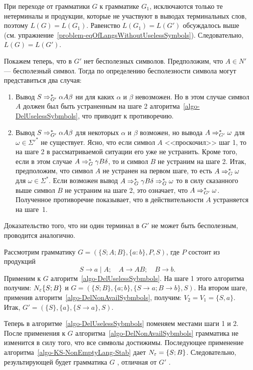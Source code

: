 \begin{myproof}
При переходе от грамматики $G$ к грамматике $G_1$, исключаются только те нетерминалы и продукции, которые не участвуют в выводах терминальных слов, поэтому $L(G)=L(G_1)$. Равенство $L(G_1)=L(G')$ обсуждалось выше (см. упражнение~\ref{problem-eqOfLangsWithoutUselessSymbols}). Следовательно, $L(G)=L(G')$.

Покажем теперь, что в $G'$ нет бесполезных символов. Предположим, что $A\in N'$ --- бесполезный символ. Тогда по определению бесполезности символа могут представиться два случая:

\begin{enumerate}
\item Вывод $S\Rightarrow_{G'}^*\alpha A\beta$ ни для каких $\alpha$ и $\beta$ невозможен. Но в этом случае символ $A$ должен был быть устраненным на шаге 2 алгоритма~\ref{algo-DelUselessSybmbols}, что приводит к противоречию.

\item Вывод $S\Rightarrow_{G'}^*\alpha A\beta$ для некоторых $\alpha$ и $\beta$ возможен, но вывода $A\Rightarrow_{G'}^*\omega$ для $\omega\in\Sigma'^*$ не существует. Ясно, что если символ $A$ <<проскочил>> шаг 1, то на шаге 2 в рассматриваемой ситуации его уже не устранить. Кроме того, если в этом случае $A\Rightarrow_G^*\gamma B\delta$, то и символ $B$ не устраним на шаге 2. Итак, предположим, что символ $A$ не устранен на первом шаге, то есть $A\Rightarrow_G^*\omega$ для $\omega\in\Sigma^*$. Если возможен вывод $A\Rightarrow_G^*\gamma B\delta\Rightarrow_G^*\omega$ то в силу сказанного выше символ $B$ не устраним на шаге 2, это означает, что $A\Rightarrow_{G'}^*\omega$. Полученное противоречие показывает, что в действительности $A$ устраняется на шаге~1.
\end{enumerate}

Доказательство того, что ни один терминал в $G'$ не может быть бесполезным, проводится аналогично.
\end{myproof}

\begin{myexample}
\label{example-algosteps}
Рассмотрим грамматику $G=(\{S;A;B\},\{a:b\},P,S)$, где $P$ состоит из продукций
\[
S\to a \mid A; \quad A\to AB; \quad B\to b.
\]
Применим к $G$ алгоритм~\ref{algo-DelUselessSybmbols}. На шаге 1 этого алгоритма получим: $N_\varepsilon\{S;B\}$ и $G=(\{S;B\},\{a;b\},\{S\to a;B\to b\},S)$. На втором шаге, применив алгоритм~\ref{algo-DelNonAvailSybmbols}, получим: $V_2=V_1=\{S,a\}$. Итак, $G'=(\{S\},\{a\},\{S\to a\},S)$.

Теперь в алгоритме~\ref{algo-DelUselessSybmbols} поменяем местами шаги 1 и 2. После применения к $G$ алгоритма~\ref{algo-DelNonAvailSybmbols} грамматика не изменится в силу того, что все символы достижимы. Последующее применение алгоритма~\ref{algo-KS-NonEmptyLang-Stab} дает $N_\varepsilon=\{S;B\}$. Следовательно, результирующей будет грамматика $G$ , отличная от $G'$ .
\end{myexample}

